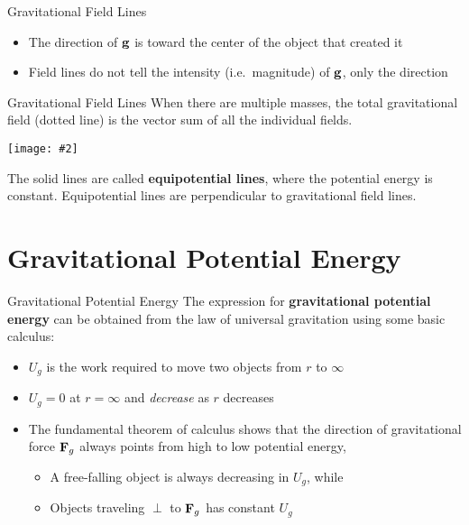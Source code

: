 \documentclass[12pt,compress,aspectratio=169]{beamer}
\newcommand{\pic}[2]{\texttt{[image: \#2]}}
\newcommand{\mb}[1]{\ensuremath\mathbf{#1}}
\newcommand{\eq}[2]{\vspace{#1}{\Large\begin{displaymath}#2\end{displaymath}}}
\begin{document}
\begin{frame}{Gravitational Field Lines}
  \begin{center}
  \end{center}
  \begin{itemize}
  \item The direction of $\mb{g}$ is toward the center of the object that
    created it
  \item Field lines do not tell the intensity (i.e.\ magnitude) of $\mb{g}$,
    only the direction
  \end{itemize}
\end{frame}



\begin{frame}{Gravitational Field Lines}
  When there are multiple masses, the total gravitational field (dotted line)
  is the vector sum of all the individual fields.
  \begin{center}
    \pic{.4}{grav-fields.png}
  \end{center}
  The solid lines are called \textbf{equipotential lines}, where the potential
  energy is constant. Equipotential lines are perpendicular to
  gravitational field lines.
\end{frame}



\section{Gravitational Potential Energy}

\begin{frame}{Gravitational Potential Energy}
  The expression for \textbf{gravitational potential energy} can be obtained
  from the law of universal gravitation using some basic calculus:

  \eq{-.2in}{
    \boxed{U_g=-G\frac{m_1m_2}{r}}
  }
  \begin{itemize}
  \item $U_g$ is the work required to move two objects from $r$ to $\infty$
  \item $U_g=0$ at $r=\infty$ and \emph{decrease} as $r$ decreases
  \item The fundamental theorem of calculus shows that the direction of
    gravitational force $\mb{F}_g$ always points from high to low potential
    energy,
    \begin{itemize}
    \item A free-falling object is always decreasing in $U_g$, while
    \item Objects traveling $\perp$ to $\mb{F}_g$ has constant $U_g$
    \end{itemize}
  \end{itemize}
\end{frame}
\end{document}
